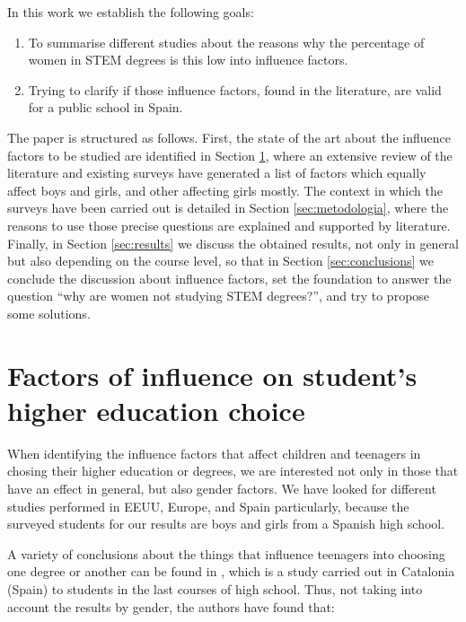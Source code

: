 \documentclass[journal,transmag]{IEEEtran}
\begin{document}
\begin{itemize}
\end{itemize}

In this work we establish the following goals:
\begin{enumerate}
	\item To summarise different studies about the reasons why the percentage of women in STEM degrees is this low into influence factors.
	\item Trying to clarify if those influence factors, found in the literature, are valid for a public school in Spain.
\end{enumerate}

The paper is structured as follows. First, the state of the art about the influence factors to be studied are identified in Section \ref{sec:factores}, where an extensive review of the literature and existing surveys have generated a list of factors which equally affect boys and girls, and other affecting girls mostly. The context in which the surveys have been carried out is detailed in Section \ref{sec:metodologia}, where the reasons to use those precise questions are explained and supported by literature. Finally, in Section \ref{sec:results} we discuss the obtained results, not only in general but also depending on the course level, so that in Section \ref{sec:conclusions} we conclude the discussion about influence factors, set the foundation to answer the question ``why are women not studying STEM degrees?'', and try to propose some solutions.

\section{Factors of influence on student's higher education choice}
\label{sec:factores}

When identifying the influence factors that affect children and teenagers in chosing their higher education or degrees, we are interested not only in those that have an effect in general, but also gender factors. We have looked for different studies performed in EEUU, Europe, and Spain particularly, because the surveyed students for our results are boys and girls from a Spanish high school.

A variety of conclusions about the things that influence teenagers into choosing one degree or another can be found in \cite{everis2012}, which is a study carried out in Catalonia (Spain) to students in the last courses of high school. Thus, not taking into account the results by gender, the authors have found that:
\end{document}
